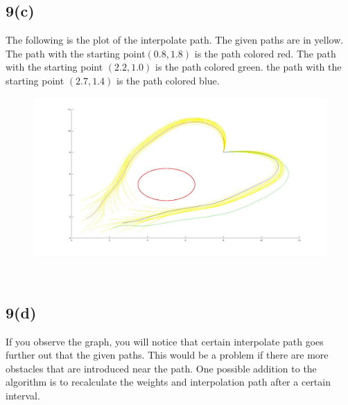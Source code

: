 \documentclass{article}
\begin{document}
\subsection*{9(c)}
The following is the plot of the interpolate path. The given paths are in yellow. The path with the starting point$(0.8, 1.8)$ is the path colored red. The path with the starting point $(2.2, 1.0)$ is the path colored green. the path with the starting point $(2.7, 1.4)$ is the path colored blue.
\begin{figure}[h]
\centering
\includegraphics[width=6in]{p9.jpg}
\end{figure}\\
\subsection*{9(d)}
If you observe the graph, you will notice that certain interpolate path goes further out that the given paths. This would be a problem if there are more obstacles that are introduced near the path. One possible addition to the algorithm is to recalculate the weights and interpolation path after a certain interval.
\end{document}
